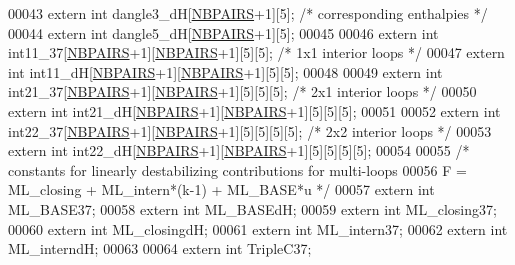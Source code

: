 \begin{DoxyCode}
00043 \textcolor{keyword}{extern} \textcolor{keywordtype}{int} dangle3\_dH[\hyperlink{energy__const_8h_a5e75221c779d618eab81e096f37e32ce}{NBPAIRS}+1][5];       \textcolor{comment}{/* corresponding enthalpies */}
00044 \textcolor{keyword}{extern} \textcolor{keywordtype}{int} dangle5\_dH[\hyperlink{energy__const_8h_a5e75221c779d618eab81e096f37e32ce}{NBPAIRS}+1][5];
00045 
00046 \textcolor{keyword}{extern} \textcolor{keywordtype}{int} int11\_37[\hyperlink{energy__const_8h_a5e75221c779d618eab81e096f37e32ce}{NBPAIRS}+1][\hyperlink{energy__const_8h_a5e75221c779d618eab81e096f37e32ce}{NBPAIRS}+1][5][5]; \textcolor{comment}{/* 1x1 interior loops */}
00047 \textcolor{keyword}{extern} \textcolor{keywordtype}{int} int11\_dH[\hyperlink{energy__const_8h_a5e75221c779d618eab81e096f37e32ce}{NBPAIRS}+1][\hyperlink{energy__const_8h_a5e75221c779d618eab81e096f37e32ce}{NBPAIRS}+1][5][5];
00048 
00049 \textcolor{keyword}{extern} \textcolor{keywordtype}{int} int21\_37[\hyperlink{energy__const_8h_a5e75221c779d618eab81e096f37e32ce}{NBPAIRS}+1][\hyperlink{energy__const_8h_a5e75221c779d618eab81e096f37e32ce}{NBPAIRS}+1][5][5][5]; \textcolor{comment}{/* 2x1 interior loops */}
00050 \textcolor{keyword}{extern} \textcolor{keywordtype}{int} int21\_dH[\hyperlink{energy__const_8h_a5e75221c779d618eab81e096f37e32ce}{NBPAIRS}+1][\hyperlink{energy__const_8h_a5e75221c779d618eab81e096f37e32ce}{NBPAIRS}+1][5][5][5];
00051 
00052 \textcolor{keyword}{extern} \textcolor{keywordtype}{int} int22\_37[\hyperlink{energy__const_8h_a5e75221c779d618eab81e096f37e32ce}{NBPAIRS}+1][\hyperlink{energy__const_8h_a5e75221c779d618eab81e096f37e32ce}{NBPAIRS}+1][5][5][5][5]; \textcolor{comment}{/* 2x2 interior loops */}
00053 \textcolor{keyword}{extern} \textcolor{keywordtype}{int} int22\_dH[\hyperlink{energy__const_8h_a5e75221c779d618eab81e096f37e32ce}{NBPAIRS}+1][\hyperlink{energy__const_8h_a5e75221c779d618eab81e096f37e32ce}{NBPAIRS}+1][5][5][5][5];
00054 
00055 \textcolor{comment}{/* constants for linearly destabilizing contributions for multi-loops}
00056 \textcolor{comment}{   F = ML\_closing + ML\_intern*(k-1) + ML\_BASE*u  */}
00057 \textcolor{keyword}{extern} \textcolor{keywordtype}{int} ML\_BASE37;
00058 \textcolor{keyword}{extern} \textcolor{keywordtype}{int} ML\_BASEdH;
00059 \textcolor{keyword}{extern} \textcolor{keywordtype}{int} ML\_closing37;
00060 \textcolor{keyword}{extern} \textcolor{keywordtype}{int} ML\_closingdH;
00061 \textcolor{keyword}{extern} \textcolor{keywordtype}{int} ML\_intern37;
00062 \textcolor{keyword}{extern} \textcolor{keywordtype}{int} ML\_interndH;
00063 
00064 \textcolor{keyword}{extern} \textcolor{keywordtype}{int} TripleC37;

\end{DoxyCode}
